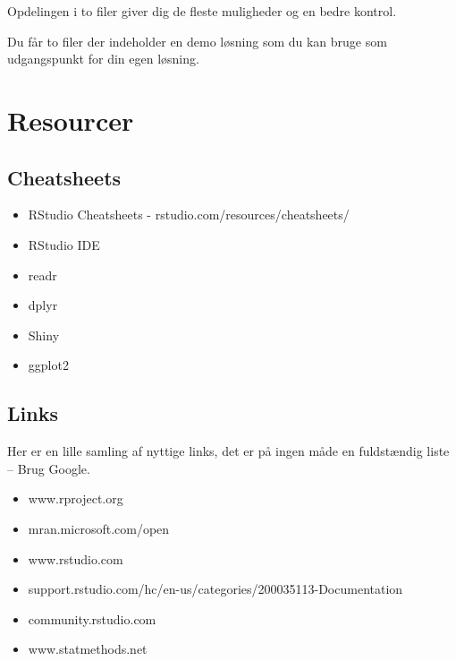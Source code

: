 \documentclass[
]{book}
\providecommand{\tightlist}{%
  \setlength{\itemsep}{0pt}\setlength{\parskip}{0pt}}
\begin{document}
Opdelingen i to filer giver dig de fleste muligheder og en bedre kontrol.

Du får to filer der indeholder en demo løsning som du kan bruge som
udgangspunkt for din egen løsning.

\hypertarget{resourcer}{%
\chapter{Resourcer}\label{resourcer}}

\hypertarget{cheatsheets}{%
\section{Cheatsheets}\label{cheatsheets}}

\begin{itemize}
\tightlist
\item
  RStudio Cheatsheets - rstudio.com/resources/cheatsheets/
\item
  RStudio IDE
\item
  readr
\item
  dplyr
\item
  Shiny
\item
  ggplot2
\end{itemize}

\hypertarget{links}{%
\section{Links}\label{links}}

Her er en lille samling af nyttige links, det er på ingen måde en fuldstændig liste -- Brug Google.

\begin{itemize}
\tightlist
\item
  www.rproject.org
\item
  mran.microsoft.com/open
\item
  www.rstudio.com
\item
  support.rstudio.com/hc/en-us/categories/200035113-Documentation
\item
  community.rstudio.com
\item
  www.statmethods.net
\end{itemize}

  
\end{document}
